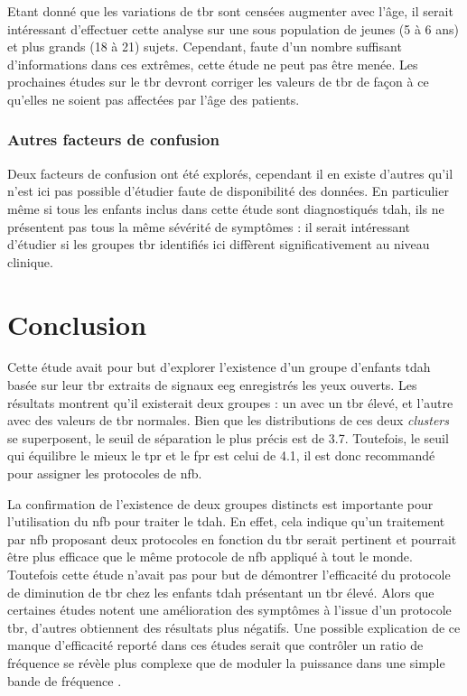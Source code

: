 Etant donné que les variations de \gls{tbr} sont censées augmenter avec l'âge, il serait intéressant d'effectuer cette analyse sur une sous population de jeunes (5 
à 6 ans) et plus grands (18 à 21) sujets. Cependant, faute d'un nombre suffisant d'informations dans ces extrêmes, cette étude ne peut pas être menée. Les prochaines
études sur le \gls{tbr} devront corriger les valeurs de \gls{tbr} de façon à ce qu'elles ne soient pas affectées par l'âge des patients.

\subsubsection{Autres facteurs de confusion}

Deux facteurs de confusion ont été explorés, cependant il en existe d'autres qu'il n'est ici pas possible d'étudier faute de disponibilité des données.
En particulier même si tous les enfants inclus dans cette étude sont diagnostiqués \gls{tdah}, ils ne présentent pas tous la même sévérité de symptômes : il serait
intéressant d'étudier si les groupes \gls{tbr} identifiés ici diffèrent significativement au niveau clinique. %


\section{Conclusion}

Cette étude avait pour but d'explorer l'existence d'un groupe d'enfants \gls{tdah} basée sur leur \gls{tbr} extraits de signaux \gls{eeg} enregistrés les yeux 
ouverts. Les résultats montrent qu'il existerait deux groupes : un avec un \gls{tbr} élevé, et l'autre avec des valeurs de \gls{tbr} normales. Bien que les 
distributions de ces deux \textit{clusters} se superposent, le seuil de séparation le plus précis est de 3.7. Toutefois, le seuil qui équilibre le mieux
le \gls{tpr} et le \gls{fpr} est celui de 4.1, il est donc recommandé pour assigner les protocoles de \gls{nfb}. 

La confirmation de l'existence de deux groupes distincts est importante pour l'utilisation du \gls{nfb} pour traiter le \gls{tdah}. En effet, cela indique 
qu'un traitement par \gls{nfb} proposant deux protocoles en fonction du \gls{tbr} serait pertinent et pourrait être plus efficace que le même protocole 
de \gls{nfb} appliqué à tout le monde. Toutefois cette étude n'avait pas pour but de démontrer l'efficacité du protocole de diminution de \gls{tbr} chez les 
enfants \gls{tdah} présentant un \gls{tbr} élevé. Alors que certaines études notent une amélioration des symptômes à l'issue d'un protocole \gls{tbr}, 
d'autres obtiennent des résultats plus négatifs. Une possible explication de ce manque d'efficacité reporté dans ces études serait que contrôler 
un ratio de fréquence se révèle plus complexe que de moduler la puissance dans une simple bande de fréquence \citep{Rogala2016}. 

